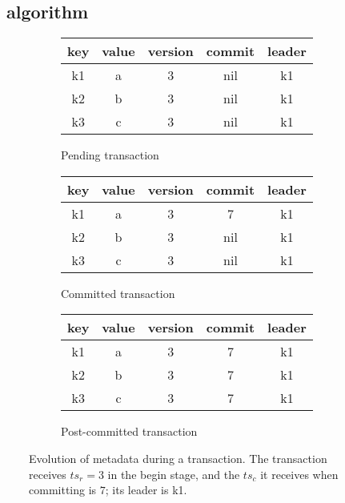 	\subsection{\sys\ algorithm} 
\label{ssec:ll}

\begin{figure}[!t]
  \centering
  
  \begin{subfigure}[t]{\columnwidth}
      \centering
    \begin{tabular}{|c|c|c|c|c|}
      \hline
      key & value & version & commit& leader\\
      \hline
      k1 & a & 3 & nil &k1\\
      k2 & b & 3 & nil &k1\\
      k3 & c & 3 & nil &k1\\
      \hline
    \end{tabular}
	\caption[]{Pending transaction}
    \label{fig:model:tentative}
  \end{subfigure}
  
  \begin{subfigure}[t]{\columnwidth}
    \centering
    \begin{tabular}{|c|c|c|c|c|}
      \hline
      key & value & version & commit& leader\\
      \hline
      k1 & a & 3 & 7&k1\\
      k2 & b & 3 & nil &k1\\
      k3 & c & 3 & nil &k1\\
      \hline
    \end{tabular}
	\caption[]{Committed transaction}
    \label{fig:model:committed}
  \end{subfigure}


  \begin{subfigure}[t]{\columnwidth}
    \centering
    \begin{tabular}{|c|c|c|c|c|}
      \hline
      key & value & version & commit& leader\\
      \hline
      k1 & a & 3 & 7&k1\\
      k2 & b & 3 & 7&k1\\
      k3 & c & 3 & 7&k1\\
      \hline
    \end{tabular}
	\caption[]{Post-committed transaction}
    \label{fig:model:postcommit}
  \end{subfigure}

  
  \caption{Evolution of metadata during a transaction. The transaction receives $ts_r=3$ in the begin stage, 
  and the $ts_c$ it receives when committing is $7$; its leader is k1.}
  \label{fig:model}
\end{figure}


